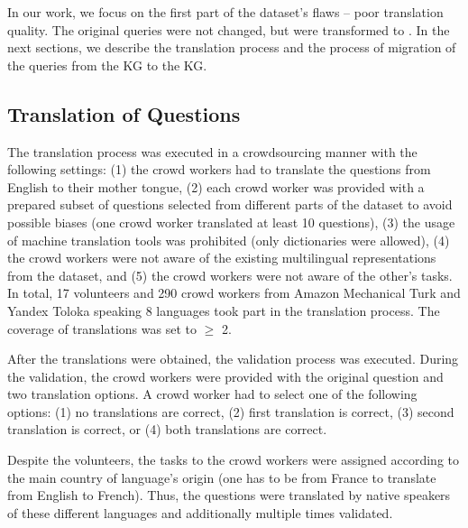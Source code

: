 \documentclass[conference]{IEEEtran}
\begin{document}
In our work, we focus on the first part of the dataset's flaws -- poor translation quality. 
The original \DBpedia queries were not changed, but were transformed to \Wikidata.
In the next sections, we describe the translation process and the process of migration of the \SPARQL queries from the \DBpedia KG to the \Wikidata KG.
\subsection{Translation of Questions}


The translation process was executed in a crowdsourcing manner with the following settings: (1) the crowd workers had to translate the questions from English to their mother tongue, (2) each crowd worker was provided with a prepared subset of questions selected from different parts of the dataset to avoid possible biases (one crowd worker translated at least 10 questions), (3) the usage of machine translation tools was prohibited (only dictionaries were allowed), (4) the crowd workers were not aware of the existing multilingual representations from the  dataset, and (5) the crowd workers were not aware of the other's tasks. 
In total, 17 volunteers and 290 crowd workers from Amazon Mechanical Turk and Yandex Toloka speaking 8 languages took part in the translation process.
The coverage of translations was set to $\geq$ 2.

After the translations were obtained, the validation process was executed.
During the validation, the crowd workers were provided with the original question and two translation options.
A crowd worker had to select one of the following options: (1) no translations are correct, (2) first translation is correct, (3) second translation is correct, or (4) both translations are correct.

Despite the volunteers, the tasks to the crowd workers were assigned according to the main country of language's origin (\eg one has to be from France to translate from English to French).
Thus, the questions were translated by native speakers of these different languages and additionally multiple times validated.
\end{document}
